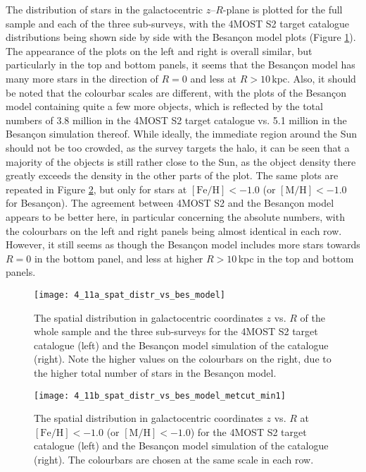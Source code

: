 \documentclass[a4paper,11pt]{article}
\begin{document}
The distribution of stars in the galactocentric $z$--$R$-plane is plotted for the full sample and each of the three sub-surveys, with the 4MOST S2 target catalogue distributions being shown side by side with the Besan\c{c}on model plots (Figure \ref{fig:spat_distr_bes_model}). The appearance of the plots on the left and right is overall similar, but particularly in the top and bottom panels, it seems that the Besan\c{c}on model has many more stars in the direction of $R=0$ and less at $R>10$\,kpc. Also, it should be noted that the colourbar scales are different, with the plots of the Besan\c{c}on model containing quite a few more objects, which is reflected by the total numbers of 3.8 million in the 4MOST S2 target catalogue vs. 5.1 million in the Besan\c{c}on simulation thereof. While ideally, the immediate region around the Sun should not be too crowded, as the survey targets the halo, it can be seen that a majority of the objects is still rather close to the Sun, as the object density there greatly exceeds the density in the other parts of the plot. The same plots are repeated in Figure \ref{fig:spat_distr_bes_model_metcut}, but only for stars at $\mathrm{[Fe/H]}<-1.0$ (or $\mathrm{[M/H]}<-1.0$ for Besan\c{c}on). The agreement between 4MOST S2 and the Besan\c{c}on model appears to be better here, in particular concerning the absolute numbers, with the colourbars on the left and right panels being almost identical in each row. However, it still seems as though the Besan\c{c}on model includes more stars towards $R=0$ in the bottom panel, and less at higher $R>10$\,kpc in the top and bottom panels.
%
\begin{figure}
 \centering
 \texttt{[image: 4\_11a\_spat\_distr\_vs\_bes\_model]}
 \caption[Spatial distribution: 4MOST S2 vs. Besan\c{c}on model]{The spatial distribution in galactocentric coordinates $z$ vs. $R$ of the whole sample and the three sub-surveys for the 4MOST S2 target catalogue (left) and the Besan\c{c}on model simulation of the catalogue (right). Note the higher values on the colourbars on the right, due to the higher total number of stars in the Besan\c{c}on model.}
 \label{fig:spat_distr_bes_model}
\end{figure}
%
\begin{figure}
 \centering
 \texttt{[image: 4\_11b\_spat\_distr\_vs\_bes\_model\_metcut\_min1]}
 \caption[Spatial distribution: 4MOST S2 vs. Besan\c{c}on model for $\mathrm{[Fe/H]}<-1.0$]{The spatial distribution in galactocentric coordinates $z$ vs. $R$ at $\mathrm{[Fe/H]}<-1.0$ (or $\mathrm{[M/H]}<-1.0$)  for the 4MOST S2 target catalogue (left) and the Besan\c{c}on model simulation of the catalogue (right). The colourbars are chosen at the same scale in each row.}
 \label{fig:spat_distr_bes_model_metcut}
\end{figure}\\ \\
\end{document}
